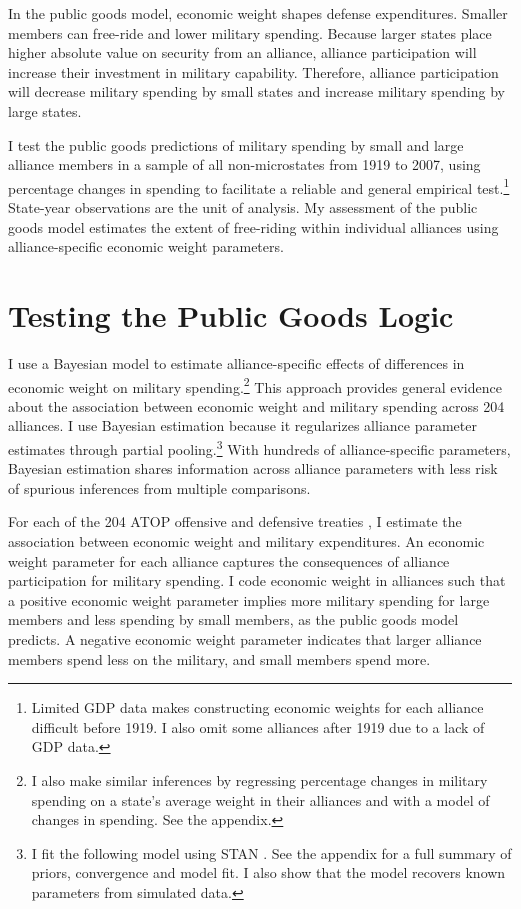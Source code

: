 \documentclass[12pt]{article}
\begin{document}
In the public goods model, economic weight shapes defense expenditures. 
Smaller members can free-ride and lower military spending. 
Because larger states place higher absolute value on security from an alliance, alliance participation will increase their investment in military capability. 
Therefore, alliance participation will decrease military spending by small states and increase military spending by large states. 


I test the public goods predictions of military spending by small and large alliance members in a sample of all non-microstates from 1919 to 2007, using percentage changes in spending to facilitate a reliable and general empirical test.\footnote{Limited GDP data makes constructing economic weights for each alliance difficult before 1919. I also omit some alliances after 1919 due to a lack of GDP data.}
State-year observations are the unit of analysis.
My assessment of the public goods model estimates the extent of free-riding within individual alliances using alliance-specific economic weight parameters.  
 

\section{Testing the Public Goods Logic}


I use a Bayesian model to estimate alliance-specific effects of differences in economic weight on military spending.\footnote{I also make similar inferences by regressing percentage changes in military spending on a state's average weight in their alliances and with a model of changes in spending. See the appendix.}
This approach provides general evidence about the association between economic weight and military spending across 204 alliances.
I use Bayesian estimation because it regularizes alliance parameter estimates through partial pooling.\footnote{I fit the following model using STAN \citep{Carpenteretal2016}. See the appendix for a full summary of priors, convergence and model fit. I also show that the model recovers known parameters from simulated data.}
With hundreds of alliance-specific parameters, Bayesian estimation shares information across alliance parameters with less risk of spurious inferences from multiple comparisons. 


For each of the 204 ATOP offensive and defensive treaties \citep{Leedsetal2002}, I estimate the association between economic weight and military expenditures. 
An economic weight parameter for each alliance captures the consequences of alliance participation for military spending. 
I code economic weight in alliances such that a positive economic weight parameter implies more military spending for large members and less spending by small members, as the public goods model predicts. 
A negative economic weight parameter indicates that larger alliance members spend less on the military, and small members spend more. 
\end{document}
